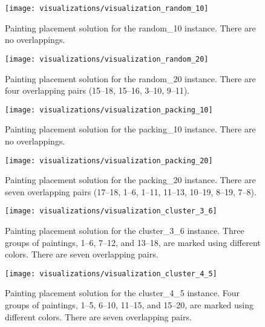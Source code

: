 \clearpage
\newpage

\begin{figure}[h!]
    \texttt{[image: visualizations/visualization\_random\_10]}
    \caption[Painting placement solution for the random\_10 instance]
        {Painting placement solution for the random\_10 instance.
    There are no overlappings.}
    \label{fig:results:visualization-random-10}
\end{figure}

\begin{figure}[h!]
    \texttt{[image: visualizations/visualization\_random\_20]}
    \caption[Painting placement solution for the random\_20 instance]
        {Painting placement solution for the random\_20 instance.
    There are four overlapping pairs (15–18, 15–16, 3–10, 9–11).}
    \label{fig:results:visualization-random-20}
\end{figure}

\begin{figure}[h!]
    \texttt{[image: visualizations/visualization\_packing\_10]}
    \caption[Painting placement solution for the packing\_10 instance]
        {Painting placement solution for the packing\_10 instance.
    There are no overlappings.}
    \label{fig:results:visualization-packing-10}
\end{figure}

\begin{figure}[h!]
    \texttt{[image: visualizations/visualization\_packing\_20]}
    \caption[Painting placement solution for the packing\_20 instance]
        {Painting placement solution for the packing\_20 instance.
    There are seven overlapping pairs (17–18, 1–6, 1–11, 11–13, 10–19, 8–19, 7–8).}
    \label{fig:results:visualization-packing-20}
\end{figure}

\begin{figure}[h!]
    \texttt{[image: visualizations/visualization\_cluster\_3\_6]}
    \caption[Painting placement solution for the cluster\_3\_6 instance]
        { Painting placement solution for the cluster\_3\_6 instance.
    Three groups of paintings, \numrange{1}{6}, \numrange{7}{12}, and \numrange{13}{18}, are marked using different colors.
    There are seven overlapping pairs.}
    \label{fig:results:visualization-cluster-3-6}
\end{figure}

\begin{figure}[h!]
    \texttt{[image: visualizations/visualization\_cluster\_4\_5]}
    \caption[Painting placement solution for the cluster\_4\_5 instance]
        { Painting placement solution for the cluster\_4\_5 instance.
    Four groups of paintings, \numrange{1}{5}, \numrange{6}{10}, \numrange{11}{15}, and \numrange{15}{20}, are marked using different colors.
    There are seven overlapping pairs.}
    \label{fig:results:visualization-cluster-4-5}
\end{figure}


